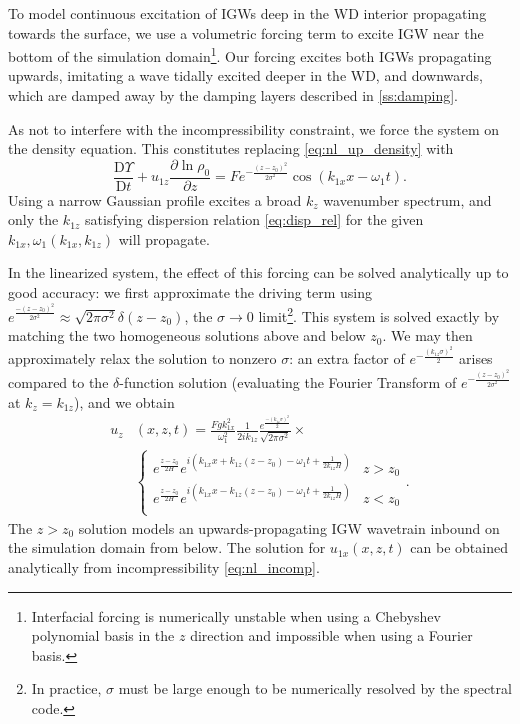 \documentclass[
        fleqn,
        usenatbib,
    ]{mnras}
\newcommand*{\pd}[2]{\frac{\partial#1}{\partial#2}}
\newcommand*{\md}[2]{\frac{\mathrm{D}#1}{\mathrm{D}#2}}
\newcommand*{\p}[1]{\left(#1\right)}
\begin{document}
To model continuous excitation of IGWs deep in the WD interior propagating
towards the surface, we use a volumetric forcing term to excite IGW near the
bottom of the simulation domain\footnote{Interfacial forcing is numerically
unstable when using a Chebyshev polynomial basis in the $z$ direction and
impossible when using a Fourier basis.}. Our forcing excites both IGWs
propagating upwards, imitating a wave tidally excited deeper in the WD, and
downwards, which are damped away by the damping layers described in
\autoref{ss:damping}.

As not to interfere with the incompressibility constraint, we force the system
on the density equation. This constitutes replacing \autoref{eq:nl_up_density}
with
\begin{equation}
    \md{\Upsilon}{t} + u_{1z}\pd{\ln \rho_0}{z}
        = Fe^{-\frac{(z - z_0)^2}{2\sigma^2}}
            \cos \p{k_{1x}x - \omega_1 t}.\label{eq:vol_drive}
\end{equation}
Using a narrow Gaussian profile excites a broad $k_z$ wavenumber spectrum, and
only the $k_{1z}$ satisfying dispersion relation \autoref{eq:disp_rel} for the
given $k_{1x}, \omega_1(k_{1x}, k_{1z})$ will propagate.

In the linearized system, the effect of this forcing can be solved analytically
up to good accuracy: we first approximate the driving term using
$e^{\frac{-(z - z_0)^2}{2\sigma^2}} \approx \sqrt{2\pi \sigma^2}\delta(z -
z_0)$, the $\sigma \to 0$ limit\footnote{In practice, $\sigma$ must be large
enough to be numerically resolved by the spectral code.}. This system is solved
exactly by matching the two homogeneous solutions above and below $z_0$. We may
then approximately relax the solution to nonzero $\sigma$: an extra factor of
$e^{-\frac{(k_{1z}\sigma)^2}{2}}$ arises compared to the $\delta$-function
solution (evaluating the Fourier Transform of $e^{-\frac{(z -
z_0)^2}{2\sigma^2}}$ at $k_z = k_{1z}$), and we obtain
\begin{align}
    u_{z}&(x, z, t) ={} \frac{Fgk_{1x}^2}{\omega_1^2}
        \frac{1}{2ik_{1z}}\frac{e^{\frac{-(k_{1z}\sigma)^2}{2}}}
        {\sqrt{2\pi\sigma^2}} \times\nonumber\\
        &{}\begin{cases}
        e^{\frac{z - z_0}{2H}}e^{i\p{k_{1x}x + k_{1z}(z - z_0) - \omega_1 t
            + \frac{1}{2k_{1z}H}}}
            & z > z_0\\
        e^{\frac{z - z_0}{2H}}e^{i\p{k_{1x}x - k_{1z}(z - z_0) - \omega_1 t
            + \frac{1}{2k_{1z}H}}}
            & z < z_0\\
    \end{cases}.\label{eq:uz_lin}
\end{align}
The $z > z_0$ solution models an upwards-propagating IGW wavetrain inbound on
the simulation domain from below. The solution for $u_{1x}(x, z, t)$ can be
obtained analytically from incompressibility \autoref{eq:nl_incomp}.
\end{document}
